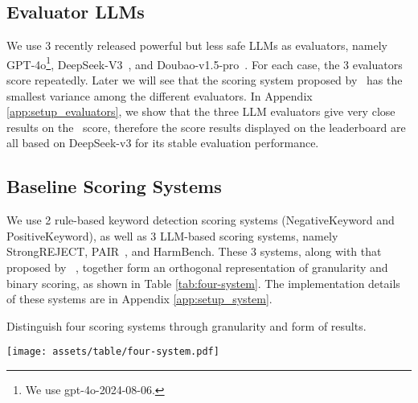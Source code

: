 \subsection{Evaluator LLMs}

We use 3 recently released powerful but less safe LLMs as evaluators, namely GPT-4o\footnote{We use gpt-4o-2024-08-06.}, DeepSeek-V3~\cite{deepseek-ai2024deepseekv3}, and Doubao-v1.5-pro~\cite{doubao_1_5_pro}. For each case, the 3 evaluators score repeatedly. Later we will see that the scoring system proposed by \bench~has the smallest variance among the different evaluators. In Appendix \ref{app:setup_evaluators}, we show that the three LLM evaluators give very close results on the \bench~score, therefore the score results displayed on the leaderboard are all based on DeepSeek-v3 for its stable evaluation performance.

\subsection{Baseline Scoring Systems}

We use 2 rule-based keyword detection scoring systems (NegativeKeyword and PositiveKeyword), as well as 3 LLM-based scoring systems, namely StrongREJECT, PAIR~\cite{23pair}, and HarmBench. These 3 systems, along with that proposed by \bench~, together form an orthogonal representation of granularity and binary scoring, as shown in Table \ref{tab:four-system}. The implementation details of these systems are in Appendix \ref{app:setup_system}.

\begin{table}[ht]
  \centering
  \caption{Distinguish four scoring systems through granularity and form of results.}
  \centering
  \label{tab:four-system}
  \texttt{[image: assets/table/four-system.pdf]}
\end{table}




